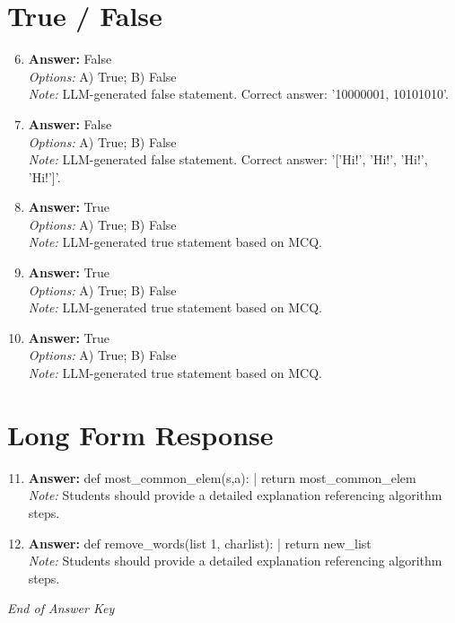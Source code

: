 \documentclass[12pt]{article}
\begin{document}
\section*{True / False}
\begin{enumerate}[label=\arabic*.]
\setcounter{enumi}{5}
\item \textbf{Answer:} False
\\ \textit{Options:} A) True; B) False
\\ \textit{Note:} LLM-generated false statement. Correct answer: '10000001, 10101010'.
\item \textbf{Answer:} False
\\ \textit{Options:} A) True; B) False
\\ \textit{Note:} LLM-generated false statement. Correct answer: '['Hi!', 'Hi!', 'Hi!', 'Hi!']'.
\item \textbf{Answer:} True
\\ \textit{Options:} A) True; B) False
\\ \textit{Note:} LLM-generated true statement based on MCQ.
\item \textbf{Answer:} True
\\ \textit{Options:} A) True; B) False
\\ \textit{Note:} LLM-generated true statement based on MCQ.
\item \textbf{Answer:} True
\\ \textit{Options:} A) True; B) False
\\ \textit{Note:} LLM-generated true statement based on MCQ.
\end{enumerate}

\section*{Long Form Response}
\begin{enumerate}[label=\arabic*.]
\setcounter{enumi}{10}
\item \textbf{Answer:} def most\_common\_elem(s,a): | return most\_common\_elem
\\ \textit{Note:} Students should provide a detailed explanation referencing algorithm steps.
\item \textbf{Answer:} def remove\_words(list 1, charlist): | return new\_list
\\ \textit{Note:} Students should provide a detailed explanation referencing algorithm steps.
\end{enumerate}

\vfill
\noindent\textit{End of Answer Key}
\end{document}
